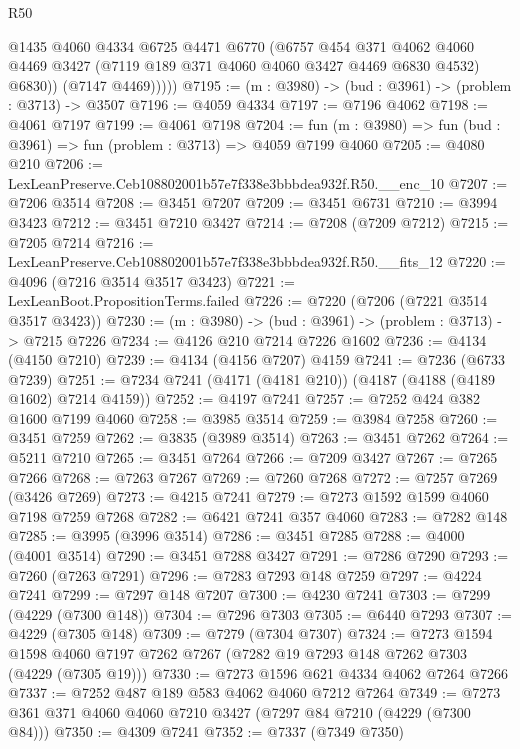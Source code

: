 \begin{lexlean}{R50}
\begin{coremodule}
              @1435
              @4060
              @4334
              @6725
              @4471
              @6770
              (@6757
                @454
                @371
                @4062
                @4060
                @4469
                @3427
                (@7119 @189 @371 @4060 @4060 @3427 @4469 @6830 @4532)
                @6830))
            (@7147 @4469)))))
@7195 := (m : @3980) -> (bud : @3961) -> (problem : @3713) -> @3507
@7196 := @4059 @4334
@7197 := @7196 @4062
@7198 := @4061 @7197
@7199 := @4061 @7198
@7204 := fun (m : @3980) => fun (bud : @3961) => fun (problem : @3713) => @4059 @7199 @4060
@7205 := @4080 @210
@7206 := LexLeanPreserve.Ceb108802001b57e7f338e3bbbdea932f.R50.__enc_10
@7207 := @7206 @3514
@7208 := @3451 @7207
@7209 := @3451 @6731
@7210 := @3994 @3423
@7212 := @3451 @7210 @3427
@7214 := @7208 (@7209 @7212)
@7215 := @7205 @7214
@7216 := LexLeanPreserve.Ceb108802001b57e7f338e3bbbdea932f.R50.__fits_12
@7220 := @4096 (@7216 @3514 @3517 @3423)
@7221 := LexLeanBoot.PropositionTerms.failed
@7226 := @7220 (@7206 (@7221 @3514 @3517 @3423))
@7230 := (m : @3980) -> (bud : @3961) -> (problem : @3713) -> @7215 @7226
@7234 := @4126 @210 @7214 @7226 @1602
@7236 := @4134 (@4150 @7210)
@7239 := @4134 (@4156 @7207) @4159
@7241 := @7236 (@6733 @7239)
@7251 := @7234 @7241 (@4171 (@4181 @210)) (@4187 (@4188 (@4189 @1602) @7214 @4159))
@7252 := @4197 @7241
@7257 := @7252 @424 @382 @1600 @7199 @4060
@7258 := @3985 @3514
@7259 := @3984 @7258
@7260 := @3451 @7259
@7262 := @3835 (@3989 @3514)
@7263 := @3451 @7262
@7264 := @5211 @7210
@7265 := @3451 @7264
@7266 := @7209 @3427
@7267 := @7265 @7266
@7268 := @7263 @7267
@7269 := @7260 @7268
@7272 := @7257 @7269 (@3426 @7269)
@7273 := @4215 @7241
@7279 := @7273 @1592 @1599 @4060 @7198 @7259 @7268
@7282 := @6421 @7241 @357 @4060
@7283 := @7282 @148
@7285 := @3995 (@3996 @3514)
@7286 := @3451 @7285
@7288 := @4000 (@4001 @3514)
@7290 := @3451 @7288 @3427
@7291 := @7286 @7290
@7293 := @7260 (@7263 @7291)
@7296 := @7283 @7293 @148 @7259
@7297 := @4224 @7241
@7299 := @7297 @148 @7207
@7300 := @4230 @7241
@7303 := @7299 (@4229 (@7300 @148))
@7304 := @7296 @7303
@7305 := @6440 @7293
@7307 := @4229 (@7305 @148)
@7309 := @7279 (@7304 @7307)
@7324 := @7273
    @1594
    @1598
    @4060
    @7197
    @7262
    @7267
    (@7282 @19 @7293 @148 @7262 @7303 (@4229 (@7305 @19)))
@7330 := @7273 @1596 @621 @4334 @4062 @7264 @7266
@7337 := @7252 @487 @189 @583 @4062 @4060 @7212 @7264
@7349 := @7273 @361 @371 @4060 @4060 @7210 @3427 (@7297 @84 @7210 (@4229 (@7300 @84)))
@7350 := @4309 @7241
@7352 := @7337 (@7349 @7350)

\end{coremodule}
\end{lexlean}
